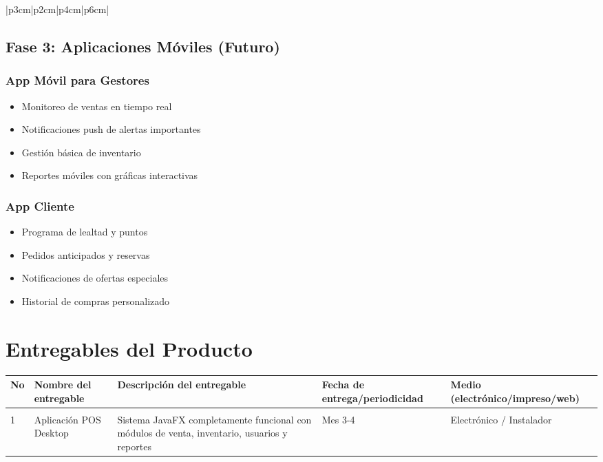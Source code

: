 \documentclass[12pt,letterpaper]{article}
\begin{document}
\begin{longtable}{|p{3cm}|p{2cm}|p{4cm}|p{6cm}|}
\subsection{Fase 3: Aplicaciones Móviles (Futuro)}

\subsubsection{App Móvil para Gestores}
\begin{itemize}
    \item Monitoreo de ventas en tiempo real
    \item Notificaciones push de alertas importantes
    \item Gestión básica de inventario
    \item Reportes móviles con gráficas interactivas
\end{itemize}

\subsubsection{App Cliente}
\begin{itemize}
    \item Programa de lealtad y puntos
    \item Pedidos anticipados y reservas
    \item Notificaciones de ofertas especiales
    \item Historial de compras personalizado
\end{itemize}

\section{Entregables del Producto}

\begin{longtable}{|>{\centering}p{1cm}|p{4cm}|p{6cm}|>{\centering}p{2.5cm}|>{\centering\arraybackslash}p{2.5cm}|}
\hline
\rowcolor{cobrablue!20}
\textbf{No} & \textbf{Nombre del entregable} & \textbf{Descripción del entregable} & \textbf{Fecha de entrega/periodicidad} & \textbf{Medio (electrónico/impreso/web)} \\
\hline
\endhead

\multicolumn{5}{|c|}{\cellcolor{cobraorange!20}\textbf{FASE 1: APLICACIÓN DE ESCRITORIO}} \\
\hline

1 & Aplicación POS Desktop & Sistema JavaFX completamente funcional con módulos de venta, inventario, usuarios y reportes & Mes 3-4 & Electrónico / Instalador \\
\hline


\end{longtable}
\end{longtable}
\end{document}
